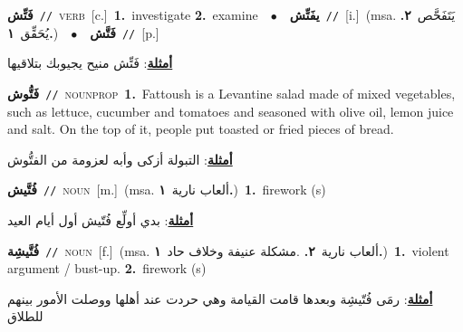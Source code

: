 \documentclass[10pt,a4paper,twoside]{article} %
\begin{document}
\begin{multicols}{2}
{{{{{{\setlength\topsep{0pt}\textbf{\foreignlanguage{arabic}{فَتِّش}}\ {\color{gray}\texttt{//}\color{black}}\ \textsc{verb}\ [c.]\ \textbf{1.}~investigate  \textbf{2.}~examine\ \ $\bullet$\ \ \setlength\topsep{0pt}\textbf{\foreignlanguage{arabic}{يفَتِّش}}\ {\color{gray}\texttt{//}\color{black}}\ [i.]\ \color{gray}(msa. \foreignlanguage{arabic}{يَتَفَحَّص}~\foreignlanguage{arabic}{\textbf{٢.}}  \foreignlanguage{arabic}{يُحَقِّق}~\foreignlanguage{arabic}{\textbf{١.}})\color{black}\ \ $\bullet$\ \ \setlength\topsep{0pt}\textbf{\foreignlanguage{arabic}{فَتَّش}}\ {\color{gray}\texttt{//}\color{black}}\ [p.]\  \begin{flushright}\color{gray}\foreignlanguage{arabic}{\textbf{\underline{\foreignlanguage{arabic}{أمثلة}}}: فَتِّش منيح يجيوبك بتلاقيها}\end{flushright}\color{black}} \vspace{2mm}

{\setlength\topsep{0pt}\textbf{\foreignlanguage{arabic}{فَتُّوش}}\ {\color{gray}\texttt{//}\color{black}}\ \textsc{noun\textunderscore prop}\ \textbf{1.}~Fattoush is a Levantine salad made of mixed  vegetables, such as lettuce, cucumber and tomatoes and seasoned with olive oil, lemon juice and salt. On the top of it, people put toasted or fried pieces of bread.\  \begin{flushright}\color{gray}\foreignlanguage{arabic}{\textbf{\underline{\foreignlanguage{arabic}{أمثلة}}}: التبولة أزكى وأبه لعزومة من الفتُّوش}\end{flushright}\color{black}} \vspace{2mm}

{\setlength\topsep{0pt}\textbf{\foreignlanguage{arabic}{فُتَّيش}}\ {\color{gray}\texttt{//}\color{black}}\ \textsc{noun}\ [m.]\ \color{gray}(msa. \foreignlanguage{arabic}{ألعاب نارية}~\foreignlanguage{arabic}{\textbf{١.}})\color{black}\ \textbf{1.}~firework (s)\  \begin{flushright}\color{gray}\foreignlanguage{arabic}{\textbf{\underline{\foreignlanguage{arabic}{أمثلة}}}: بدي أولِّع فُتّيش أول أيام العيد}\end{flushright}\color{black}} \vspace{2mm}

{\setlength\topsep{0pt}\textbf{\foreignlanguage{arabic}{فُتَّيشِة}}\ {\color{gray}\texttt{//}\color{black}}\ \textsc{noun}\ [f.]\ \color{gray}(msa. \foreignlanguage{arabic}{ألعاب نارية}~\foreignlanguage{arabic}{\textbf{٢.}}  .\foreignlanguage{arabic}{مشكلة عنيفة وخلاف حاد}~\foreignlanguage{arabic}{\textbf{١.}})\color{black}\ \textbf{1.}~violent argument / bust-up.  \textbf{2.}~firework (s)\  \begin{flushright}\color{gray}\foreignlanguage{arabic}{\textbf{\underline{\foreignlanguage{arabic}{أمثلة}}}: رمَى فُتّيشِة وبعدها قامت القيامة وهي حردت عند أهلها ووصلت الأمور بينهم للطلاق}\end{flushright}\color{black}} \vspace{2mm}

}}}}}
\end{multicols}
\end{document}
